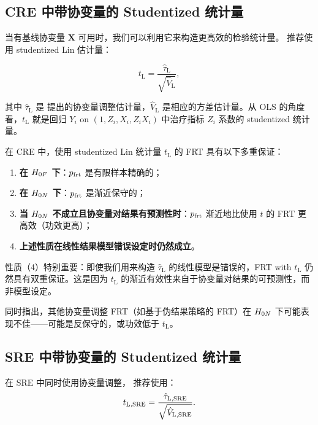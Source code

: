 \subsection{CRE 中带协变量的 Studentized 统计量}
\label{sec:8-cre-covariate}

当有基线协变量 $\mathbf{X}$ 可用时，我们可以利用它来构造更高效的检验统计量。\citet{ZhaoDing:2021a} 推荐使用 studentized Lin 估计量：

\[
t_\mathrm{L} = \frac{\hat\tau_\mathrm{L}}{\sqrt{\hat V_\mathrm{L}}} ,
\label{eq:8-lin-statistic}
\]

其中 $\hat\tau_\mathrm{L}$ 是 \citet{Lin:2013} 提出的协变量调整估计量，$\hat V_\mathrm{L}$ 是相应的方差估计量。从 OLS 的角度看，$t_\mathrm{L}$ 就是回归 $Y_i$ on $(1, Z_i, X_i, Z_i X_i)$ 中治疗指标 $Z_i$ 系数的 studentized 统计量。

\begin{Theorem}\label{th:8-covariate-guarantee}
在 CRE 中，使用 studentized Lin 统计量 $t_\mathrm{L}$ 的 FRT 具有以下多重保证：
\begin{enumerate}
  \item \textbf{在 $H_{0F}$ 下}：$p_{\text{frt}}$ 是有限样本精确的；
  \item \textbf{在 $H_{0N}$ 下}：$p_{\text{frt}}$ 是渐近保守的；
  \item \textbf{当 $H_{0N}$ 不成立且协变量对结果有预测性时}：$p_{\text{frt}}$ 渐近地比使用 $t$ 的 FRT 更高效（功效更高）；
  \item \textbf{上述性质在线性结果模型错误设定时仍然成立}。
\end{enumerate}
\end{Theorem}

性质（4）特别重要：即使我们用来构造 $\hat\tau_\mathrm{L}$ 的线性模型是错误的，FRT with $t_\mathrm{L}$ 仍然具有双重保证。这是因为 $t_\mathrm{L}$ 的渐近有效性来自于协变量对结果的可预测性，而非模型设定。

\citet{ZhaoDing:2021a} 同时指出，其他协变量调整 FRT（如基于伪结果策略的 FRT）在 $H_{0N}$ 下可能表现不佳——可能是反保守的，或功效低于 $t_\mathrm{L}$。

\subsection{SRE 中带协变量的 Studentized 统计量}
\label{sec:8-sre-covariate}

在 SRE 中同时使用协变量调整，\citet{ZhaoDing:2021a} 推荐使用：
\[
t_{\mathrm{L},\text{SRE}} = \frac{\hat\tau_{\mathrm{L},\text{SRE}}}{\sqrt{\hat V_{\mathrm{L},\text{SRE}}}} .
\label{eq:8-lin-sre-statistic}
\]

